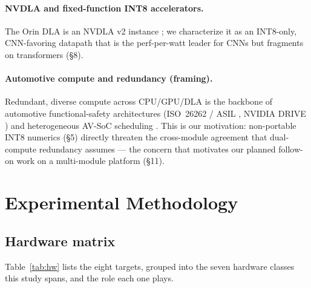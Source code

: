 \documentclass[11pt]{article}
\begin{document}
\paragraph{NVDLA and fixed-function INT8 accelerators.}
The Orin DLA is an NVDLA v2 instance \citep{nvdla, farshchi2019nvdla}; we characterize it as an INT8-only, CNN-favoring datapath that is the perf-per-watt leader for CNNs but fragments on transformers (\S8).

\paragraph{Automotive compute and redundancy (framing).}
Redundant, diverse compute across CPU/GPU/DLA is the backbone of automotive functional-safety architectures (ISO~26262 / ASIL \citep{iso26262}, NVIDIA DRIVE \citep{nvidiadrive}) and heterogeneous AV-SoC scheduling \citep{hetsched2022}. This is our motivation: non-portable INT8 numerics (\S5) directly threaten the cross-module agreement that dual-compute redundancy assumes --- the concern that motivates our planned follow-on work on a multi-module platform (\S11).

\section{Experimental Methodology}

\subsection{Hardware matrix}
Table~\ref{tab:hw} lists the eight targets, grouped into the seven hardware classes this study spans, and the role each one plays.
\end{document}
